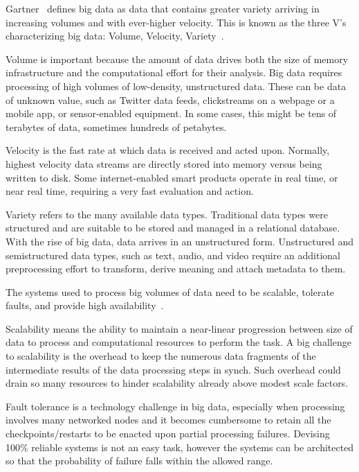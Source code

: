 Gartner~\cite{Gartner} defines big data as data that contains greater variety arriving in increasing volumes and with ever-higher velocity. This is known as the three V's characterizing  big data: Volume, Velocity, Variety~\cite{WhatIsBigData}. 

Volume is important because the amount of data drives both the size of memory infrastructure  and the computational effort for their analysis. Big data requires processing of high volumes of low-density, unstructured data. These can be data of unknown value, such as Twitter data feeds, clickstreams on a webpage or a mobile app, or sensor-enabled equipment. In some cases, this might be tens of terabytes of data, sometimes hundreds of petabytes. 

Velocity is the fast rate at which data is received and acted upon. Normally, highest velocity data streams are directly stored into memory versus being written to disk. Some internet-enabled smart products operate in real time, or near real time, requiring a very fast evaluation and action. 

Variety refers to the many available data types. Traditional data types were structured and are suitable to be stored and managed in a relational database. With the rise of big data, data arrives in an unstructured form. Unstructured and semistructured data types, such as text, audio, and video require an additional preprocessing effort to transform, derive meaning and attach metadata to them. 

The systems used to process big volumes of data need to be scalable, tolerate faults, and provide high availability~\cite{articleBigData:2017}.


Scalability means the ability to maintain a near-linear progression between size of data to process and computational resources to perform the task. A big challenge to scalability is the overhead to keep the numerous data fragments of the intermediate results of the data processing steps in synch. Such overhead could drain so many resources to hinder scalability already above modest scale factors.

Fault tolerance is a technology challenge in big data, especially when processing involves many networked nodes and it becomes cumbersome to retain all the checkpoints/restarts to be  enacted upon partial processing failures. Devising 100\% reliable systems is not an easy task, however the systems can be architected so that the probability of failure falls within the allowed range. 

